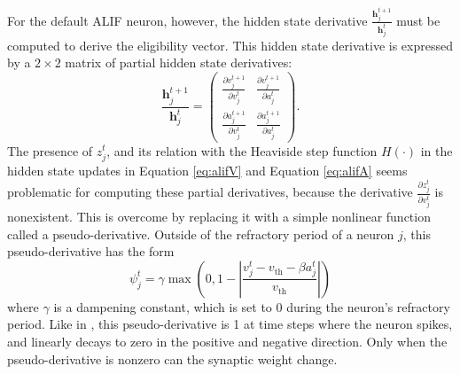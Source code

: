             For the default ALIF neuron, however, the hidden state derivative $\frac{\mathbf{h}^{t+1}_j}{\mathbf{h}^t_j}$ must be computed to derive the eligibility vector.
            This hidden state derivative is expressed by a $2\times2$ matrix of partial hidden state derivatives:
            \begin{equation}
            \frac{\mathbf{h}^{t+1}_j}{\mathbf{h}^t_j} = \begin{pmatrix}
            \frac{\partial v^{t+1}_j}{\partial v^t_j} & \frac{\partial v^{t+1}_j}{\partial a^t_j}\\
            \frac{\partial a^{t+1}_j}{\partial v^t_j} & \frac{\partial a^{t+1}_j}{\partial a^t_j}
            \end{pmatrix}.
            \end{equation}
            The presence of $z^t_j$, and its relation with the Heaviside step function $H(\cdot)$ in the hidden state updates in Equation \ref{eq:alifV} and Equation \ref{eq:alifA} seems problematic for computing these partial derivatives, because the derivative $\frac{\partial z^t_j}{\partial v^t_j}$ is nonexistent.
            This is overcome by replacing it with a simple nonlinear function called a pseudo-derivative.
            Outside of the refractory period of a neuron $j$, this pseudo-derivative has the form
            \begin{equation}
            \psi_j^t = \gamma \max\left(0, 1 - \left|\frac{v_j^t - v_\text{th} - \beta a^t_j}{v_\text{th}}\right|\right)
            \end{equation}
            where $\gamma$ is a dampening constant, which is set to 0 during the neuron's refractory period.
            Like in \citet{esser2016convolutional}, this pseudo-derivative is 1 at time steps where the neuron spikes, and linearly decays to zero in the positive and negative direction.
            Only when the pseudo-derivative is nonzero can the synaptic weight change.

